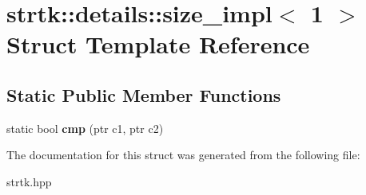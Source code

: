 \hypertarget{structstrtk_1_1details_1_1size__impl_3_011_01_4}{\section{strtk\-:\-:details\-:\-:size\-\_\-impl$<$ 1 $>$ Struct Template Reference}
\label{structstrtk_1_1details_1_1size__impl_3_011_01_4}
}
\subsection*{Static Public Member Functions}
\begin{DoxyCompactItemize}
\item 
\hypertarget{structstrtk_1_1details_1_1size__impl_3_011_01_4_aa1a120d7094f821f25b09ba095796555}{static bool {\bfseries cmp} (ptr c1, ptr c2)}\label{structstrtk_1_1details_1_1size__impl_3_011_01_4_aa1a120d7094f821f25b09ba095796555}

\end{DoxyCompactItemize}


The documentation for this struct was generated from the following file\-:\begin{DoxyCompactItemize}
\item 
strtk.\-hpp\end{DoxyCompactItemize}
